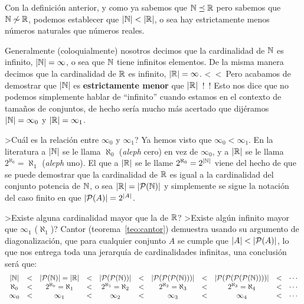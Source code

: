 \begin{ejemplo}
Con la definición anterior, y como ya sabemos que $\N\preceq\R$ pero sabemos que $\N\not\eqr\R$, podemos establecer que $|\N|<|\R|$, o sea hay estrictamente menos números naturales que números reales.
\end{ejemplo}

Generalmente (coloquialmente) nosotros decimos que la cardinalidad de $\N$ es infinito, $|\N|=\infty$, o sea que $\N$ tiene infinitos elementos.
De la misma manera decimos que la cardinalidad de $\R$ es infinito, $|\R|=\infty$.
<~<~Pero acabamos de demostrar que $|\N|$ es {\bf estrictamente menor} que $|\R|$~!~!
Esto nos dice que no podemos simplemente hablar de ``infinito'' cuando estamos en el contexto de tamaños de conjuntos, de hecho sería mucho más acertado que dijéramos $|\N|=\infty_0$ y $|\R|=\infty_1$.

>Cuál es la relación entre $\infty_0$ y $\infty_1$?
Ya hemos visto que $\infty_0<\infty_1$.
En la literatura a $|\N|$ se le llama $\aleph_0$ (\emph{aleph} cero) en vez de $\infty_0$, y a $|\R|$ se le llama $2^{\aleph_0}=\aleph_1$ (\emph{aleph} uno).
El que a $|\R|$ se le llame $2^{\aleph_0}=2^{|\N|}$ viene del hecho de que se puede demostrar que la cardinalidad de $\R$ es igual a la cardinalidad del conjunto potencia de $\N$, o sea $|\R|=|\P(\N)|$ y simplemente se sigue la notación del caso finito en que $|\P(A)|=2^{|A|}$.

>Existe alguna cardinalidad mayor que la de $\R$?
>Existe algún infinito mayor que $\infty_1$ ($\aleph_1$)?
Cantor (teorema~\ref{teo:cantor}) demuestra usando su argumento de diagonalización, que para cualquier conjunto $A$ se cumple que $|A|<|\P(A)|$, lo que nos entrega toda una jerarquía de cardinalidades infinitas, una conclusión será que:
\[
\begin{array}{cccccccccccccc}
|\N|&<&|\P(\N)|=|\R|&<&|\P(\P(\N))|&<&|\P(\P(\P(\N)))|&<&|\P(\P(\P(\P(\N))))|&<&\cdots \\
\aleph_0&<&2^{\aleph_0}=\aleph_1&<&2^{\aleph_1}=\aleph_2&<&2^{\aleph_2}=\aleph_3&<&2^{\aleph_3}=\aleph_4&<&\cdots \\
\infty_0&<&\infty_1&<&\infty_2&<&\infty_3&<&\infty_4&<&\cdots
\end{array}
\]


